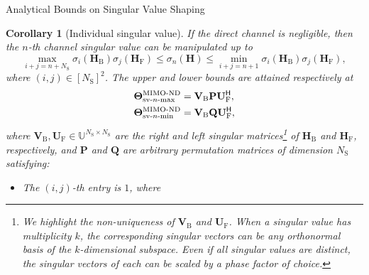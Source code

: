 \documentclass[journal]{IEEEtran}
\newtheorem{corollary}{Corollary}[proposition]
\begin{document}
\begin{section}{Analytical Bounds on Singular Value Shaping}
		\begin{corollary}[Individual singular value\label{co:sv_nth}]
			If the direct channel is negligible,
			then the $n$-th channel singular value can be manipulated up to
			\begin{equation}
				\max_{i+j=n+N_\mathrm{S}} \sigma_i(\mathbf{H}_\mathrm{B}) \sigma_j(\mathbf{H}_\mathrm{F}) \le \sigma_n(\mathbf{H}) \le \min_{i+j=n+1} \sigma_i(\mathbf{H}_\mathrm{B}) \sigma_j(\mathbf{H}_\mathrm{F}),
				\label{iq:sv_nth}
			\end{equation}
			where $(i, j) \in [N_\mathrm{S}]^2$.
			The upper and lower bounds are attained respectively at
			\begin{subequations}
				\label{eq:sv_nth}
				\begin{align}
					\mathbf{\Theta}_{\textnormal{sv-}n\textnormal{-max}}^\textnormal{MIMO-ND} & = \mathbf{V}_\mathrm{B} \mathbf{P} \mathbf{U}_\mathrm{F}^\mathsf{H}, \label{eq:sv_nth_max} \\
					\mathbf{\Theta}_{\textnormal{sv-}n\textnormal{-min}}^\textnormal{MIMO-ND} & = \mathbf{V}_\mathrm{B} \mathbf{Q} \mathbf{U}_\mathrm{F}^\mathsf{H}, \label{eq:sv_nth_min}
				\end{align}
			\end{subequations}
			where $\mathbf{V}_\mathrm{B}, \mathbf{U}_\mathrm{F} \in \mathbb{U}^{N_\mathrm{S} \times N_\mathrm{S}}$ are the right and left singular matrices\footnote{We highlight the non-uniqueness of $\mathbf{V}_\mathrm{B}$ and $\mathbf{U}_\mathrm{F}$. When a singular value has multiplicity $k$, the corresponding singular vectors can be any orthonormal basis of the $k$-dimensional subspace. Even if all singular values are distinct, the singular vectors of each can be scaled by a phase factor of choice.} of $\mathbf{H}_\mathrm{B}$ and $\mathbf{H}_\mathrm{F}$, respectively,
			and $\mathbf{P}$ and $\mathbf{Q}$ are arbitrary permutation matrices of dimension $N_\mathrm{S}$ satisfying:
			\begin{itemize}
				\item The $(i, j)$-th entry is $1$, where

\end{itemize}
\end{corollary}
\end{section}
\end{document}
